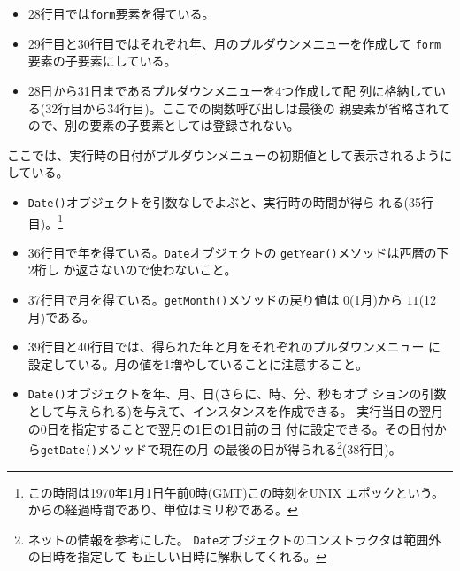 \begin{Exec}
\begin{itemize}
 \item 28行目では\texttt{form}要素を得ている。
 \item 29行目と30行目ではそれぞれ年、月のプルダウンメニューを作成して
       \texttt{form}要素の子要素にしている。
 \item 28日から31日まであるプルダウンメニューを4つ作成して配
       列に格納している(32行目から34行目)。ここでの関数呼び出しは最後の
       親要素が省略されてので、別の要素の子要素としては登録されない。
\end{itemize}
ここでは、実行時の日付がプルダウンメニューの初期値として表示されるように
 している。
\begin{itemize}
 \item \texttt{Date()}オブジェクトを引数なしでよぶと、実行時の時間が得ら
       れる(35行目)。\footnote{この時間は1970年1月1日午前0時(GMT)この時刻をUNIX
       エポックという。 からの経過時間であり、単位はミリ秒である。}
 \item 36行目で年を得ている。\texttt{Date}オブジェクトの
       \texttt{getYear()}メソッドは西暦の下2桁し
       か返さないので使わないこと。
 \item 37行目で月を得ている。\texttt{getMonth()}メソッドの戻り値は
       $0$(1月)から $11$(12月)である。
 \item 39行目と40行目では、得られた年と月をそれぞれのプルダウンメニュー
       に設定している。月の値を1増やしていることに注意すること。
 \item \texttt{Date()}オブジェクトを年、月、日(さらに、時、分、秒もオプ
       ションの引数として与えられる)を与えて、インスタンスを作成できる。
       実行当日の翌月の0日を指定することで翌月の1日の1日前の日
       付に設定できる。その日付から\texttt{getDate()}メソッドで現在の月
       の最後の日が得られる\footnote{ネットの情報を参考にした。
       \texttt{Date}オブジェクトのコンストラクタは範囲外の日時を指定して
       も正しい日時に解釈してくれる。}(38行目)。
       

\end{itemize}
\end{Exec}

